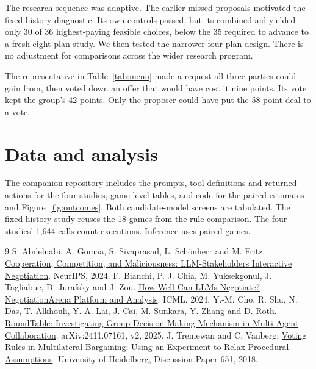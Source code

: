\documentclass[11pt]{article}
\begin{document}
The research sequence was adaptive. The earlier missed proposals motivated the fixed-history diagnostic. Its own controls passed, but its combined aid yielded only 30 of 36 highest-paying feasible choices, below the 35 required to advance to a fresh eight-plan study. We then tested the narrower four-plan design. There is no adjustment for comparisons across the wider research program.

The representative in Table~\ref{tab:menu} made a request all three parties could gain from, then voted down an offer that would have cost it nine points. Its vote kept the group's 42 points. Only the proposer could have put the 58-point deal to a vote.

\section*{Data and analysis}
The \href{https://github.com/tofuadmiral/institutional-representation-abm/tree/main/paper3/manuscript}{companion repository} includes the prompts, tool definitions and returned actions for the four studies, game-level tables, and code for the paired estimates and Figure~\ref{fig:outcomes}. Both candidate-model screens are tabulated. The fixed-history study reuses the 18 games from the rule comparison. The four studies' 1,644 calls count executions. Inference uses paired games.

\begin{thebibliography}{9}\small
{} S. Abdelnabi, A. Gomaa, S. Sivaprasad, L. Sch\"onherr and M. Fritz. \href{https://proceedings.neurips.cc/paper_files/paper/2024/hash/984dd3db213db2d1454a163b65b84d08-Abstract.html}{Cooperation, Competition, and Maliciousness: LLM-Stakeholders Interactive Negotiation}. NeurIPS, 2024.
 F. Bianchi, P. J. Chia, M. Yuksekgonul, J. Tagliabue, D. Jurafsky and J. Zou. \href{https://proceedings.mlr.press/v235/bianchi24a.html}{How Well Can LLMs Negotiate? NegotiationArena Platform and Analysis}. ICML, 2024.
 Y.-M. Cho, R. Shu, N. Das, T. Alkhouli, Y.-A. Lai, J. Cai, M. Sunkara, Y. Zhang and D. Roth. \href{https://arxiv.org/abs/2411.07161}{RoundTable: Investigating Group Decision-Making Mechanism in Multi-Agent Collaboration}. arXiv:2411.07161, v2, 2025.
 J. Tremewan and C. Vanberg. \href{https://www.awi.uni-heidelberg.de/md/awi/institut/awlecture/dp651.pdf}{Voting Rules in Multilateral Bargaining: Using an Experiment to Relax Procedural Assumptions}. University of Heidelberg, Discussion Paper 651, 2018.
\end{thebibliography}
\end{document}
